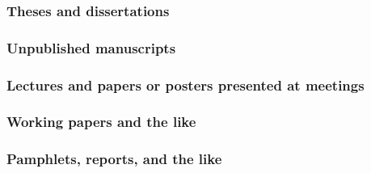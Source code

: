 \documentclass[11pt,letterpaper,oneside]{article}
\begin{document}
\setcounter{subsubsection}{214}
\subsubsection{Theses and dissertations}

\begin{citebib}
\item \cite[59]{vedrashko2006}
\item \cite[v]{subacus2015}
\item \cite{choi2008}
\end{citebib}

\subsubsection{Unpublished manuscripts}
\label{14.216}

\begin{citebib}
\item \cite{balderdash2017}
\end{citebib}

\subsubsection{Lectures and papers or posters presented at meetings}
\label{14.217}

\begin{bibonly}
\nocite{hong2015}
\nocite{teplin2005}
\end{bibonly}

\subsubsection{Working papers and the like}
\label{14.218}

\begin{citebib}
\item \cite{lucki1980}
\item \cite{bronfenbrenner2011}
\item \cite{alarcon1771}
\end{citebib}

\setcounter{subsubsection}{219}
\subsubsection{Pamphlets, reports, and the like}
\end{document}
